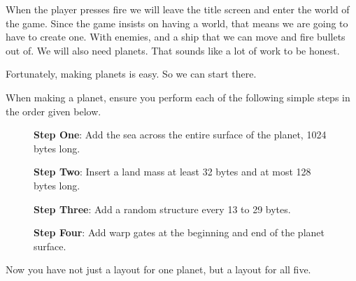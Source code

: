 When the player presses fire we will leave the title screen and enter the world of the game. Since the
game insists on having a world, that means we are going to have to create one. With enemies, and a ship
that we can move and fire bullets out of. We will also need planets. That sounds like a lot of work to be honest.

Fortunately, making planets is easy. So we can start there. 

When making a planet, ensure you perform each of the following
simple steps in the order given below.

\begin{figure}[H]
  {
    \begin{adjustbox}{width=10cm,center}
    \end{adjustbox}
  }\caption[]{\textbf{Step One}: Add the sea across the entire surface of the planet, 1024 bytes long.}
\end{figure}

\begin{figure}[H]
  {
    \begin{adjustbox}{width=10cm,center}
    \end{adjustbox}
  }\caption[]{\textbf{Step Two}: Insert a land mass at least 32 bytes and at most 128 bytes long.}
\end{figure}

\begin{figure}[H]
  {
    \begin{adjustbox}{width=10cm,center}
    \end{adjustbox}
  }\caption[]{\textbf{Step Three}: Add a random structure every 13 to 29 bytes.}
\end{figure}

\begin{figure}[H]
  {
    \begin{adjustbox}{width=10cm,center}
    \end{adjustbox}
  }\caption[]{\textbf{Step Four}: Add warp gates at the beginning and end of the planet surface.}
\end{figure}

Now you have not just a layout for one planet, but a layout for all five.

